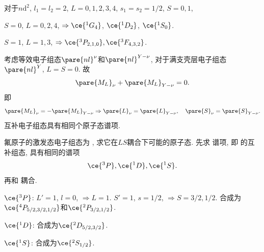 \documentclass[hidelinks]{ctexart}
\begin{document}
\begin{ex}
    对于$n\mathrm{d}^2$, $l_1 = l_2 = 2$, $L = 0,1,2,3,4$, $s_1 = s_2 = 1/2$, $S=0,1$,
    \begin{cenum}
        \item $S=0$, $L=0,2,4$, $\Rightarrow \ce{^1G_4}$, $\ce{^1D_2}$, $\ce{^1S_0}$.
        \item $S=1$, $L=1,3$, $\Rightarrow \ce{^3P_{2,1,0}}, \ce{^3F_{4,3,2}}$.
    \end{cenum}
\end{ex}
考虑等效电子组态$\pare{nl}^\nu$和$\pare{nl}^{Y-\nu}$, 对于满支壳层电子组态$\pare{nl}^Y$, $L=S=0$. 故
\[ \pare{M_L}_\nu + \pare{M_L}_{Y-\nu} = 0. \]
即
\[ \pare{M_L}_\nu = -\pare{M_L}_{Y-\nu} \Rightarrow \pare{L}_\nu = \pare{L}_{Y-\nu},\quad \pare{S}_\nu = \pare{S}_{Y-\nu}. \]
互补电子组态具有相同个原子态谱项.
\begin{ex}
    氟原子的激发态电子组态为 , 求它在$LS$耦合下可能的原子态. 先求  谱项, 即 的互补组态, 具有相同的谱项
        \[ \ce{^3P}, \ce{^1D}, \ce{^1S}. \]
        再和  耦合.
    \begin{cenum}
        \item $\ce{^3P}$: $L'=1$, $l=0$, $\Rightarrow L=1$. $S'=1$, $s=1/2$, $\Rightarrow S=3/2,1/2$. 合成为$\ce{^4P_{5/2,3/2,1/2}}$和$\ce{^2P_{3/2,1/2}}$.
        \item $\ce{^1D}$: 合成为$\ce{^2D_{5/2,3/2}}$.
        \item $\ce{^1S}$: 合成为$\ce{^2S_{1/2}}$.
    \end{cenum}
\end{ex}


\label{ssub:jj耦合情形}
\end{document}
